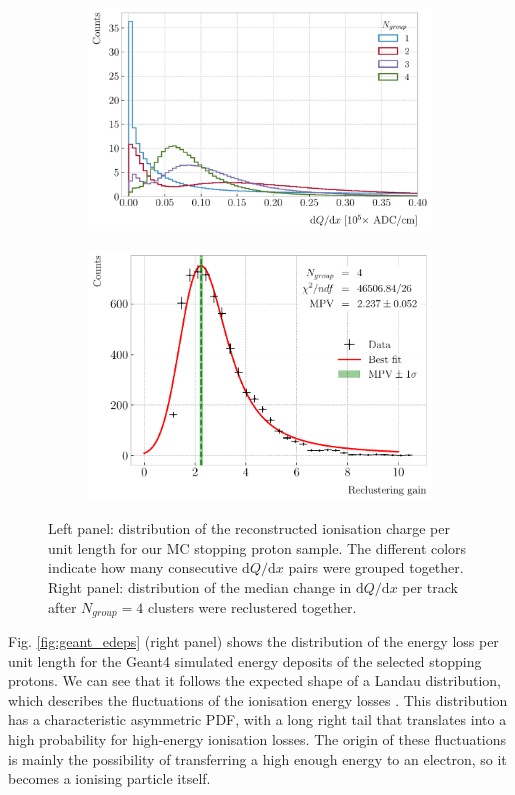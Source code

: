 \begin{figure}[t]
	\begin{subfigure}{0.5\textwidth}
		\centering
		\includegraphics[width=.90\linewidth]{Images/GArSoft_PID/dEdx/reco_dQdx_groups.pdf}
	\end{subfigure}
	\begin{subfigure}{0.5\textwidth}
		\centering
		\includegraphics[width=.90\linewidth]{Images/GArSoft_PID/dEdx/dQdx_recluster_gain.pdf}
	\end{subfigure}
	\caption{Left panel: distribution of the reconstructed ionisation charge per unit length for our MC stopping proton sample. The different colors indicate how many consecutive $\mathrm{d}Q/\mathrm{d}x$ pairs were grouped together. Right panel: distribution of the median change in $\mathrm{d}Q/\mathrm{d}x$ per track after $N_{group}=4$ clusters were reclustered together.}
	\label{fig:reco_dQ_groups}
\end{figure}

Fig. \ref{fig:geant_edeps} (right panel) shows the distribution of the energy loss per unit length for the Geant4 simulated energy deposits of the selected stopping protons. We can see that it follows the expected shape of a Landau distribution, which describes the fluctuations of the ionisation energy losses \cite{Landau1944}. This distribution has a characteristic asymmetric PDF, with a long right tail that translates into a high probability for high-energy ionisation losses. The origin of these fluctuations is mainly the possibility of transferring a high enough energy to an electron, so it becomes a ionising particle itself.

